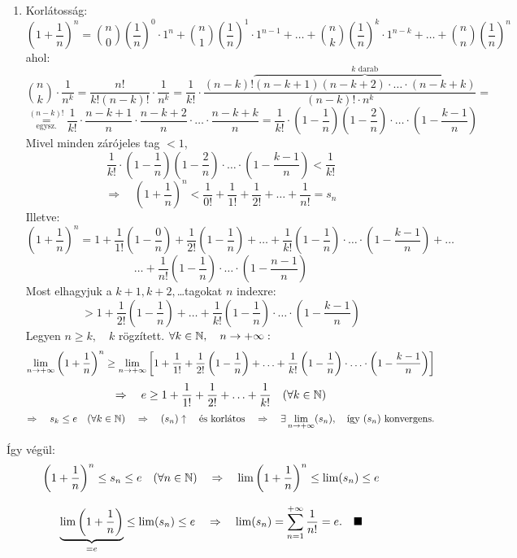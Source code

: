 \documentclass[a4paper,11.5pt]{article}
\begin{document}
\begin{enumerate}
\begin{enumerate}
			\item Korlátosság: 
			\[ \left(1+\frac{1}{n}\right)^n=\binom{n}{0}\left(\frac{1}{n}\right)^0\cdot1^n+\binom{n}{1}\left(\frac{1}{n}\right)^1\cdot1^{n-1}+\ldots+\binom{n}{k}\left(\frac{1}{n}\right)^k\cdot1^{n-k}+\ldots+\binom{n}{n}\left(\frac{1}{n}\right)^n \]
			ahol:
			\[ \binom{n}{k}\cdot\frac{1}{n^k}=\frac{n!}{k!(n-k)!}\cdot\frac{1}{n^k}=\frac{1}{k!}\cdot\frac{(n-k)!\overbrace{(n-k+1)(n-k+2)\cdot\ldots\cdot(n-k+k)}^{\text{$k$ darab}}}{(n-k)!\cdot n^k}= \]
			\[ \overset{(n-k)!}{\underset{\text{egysz.}}{=}}\frac{1}{k!}\cdot\frac{n-k+1}{n}\cdot\frac{n-k+2}{n}\cdot\ldots\cdot\frac{n-k+k}{n}=\frac{1}{k!}\cdot\left(1-\frac{1}{n}\right)\left(1-\frac{2}{n}\right)\cdot\ldots\cdot\left(1-\frac{k-1}{n}\right) \]
			Mivel minden zárójeles tag $<1$,
			\[ \frac{1}{k!}\cdot\left(1-\frac{1}{n}\right)\left(1-\frac{2}{n}\right)\cdot\ldots\cdot\left(1-\frac{k-1}{n}\right)<\frac{1}{k!} \] 
			\[ \Rightarrow\quad \left(1+\frac{1}{n}\right)^n<\frac{1}{0!}+\frac{1}{1!}+\frac{1}{2!}+\ldots+\frac{1}{n!}=s_n \]
			Illetve:
			\[ \left(1+\frac{1}{n}\right)^n=1+\frac{1}{1!}\left(1-\frac{0}{n}\right)+\frac{1}{2!}\left(1-\frac{1}{n}\right)+\ldots+\frac{1}{k!}\left(1-\frac{1}{n}\right)\cdot\ldots\cdot\left(1-\frac{k-1}{n}\right)+\ldots\]
			\[\ldots+\frac{1}{n!}\left(1-\frac{1}{n}\right)\cdot\ldots\cdot\left(1-\frac{n-1}{n}\right) \]
			Most elhagyjuk a $k+1, k+2,$\ldots tagokat $n$ indexre:
			\[ >1+\frac{1}{2!}\left(1-\frac{1}{n}\right)+\ldots+\frac{1}{k!}\left(1-\frac{1}{n}\right)\cdot\ldots\cdot\left(1-\frac{k-1}{n}\right) \]
			Legyen $n\geq k, \quad k$ rögzített. \quad $\forall k\in \mathbb{N}, \quad n\to+\infty:$
			\[\displaystyle\lim_{n\to +\infty}\left(1+\frac{1}{n}\right)^n\geq\displaystyle\lim_{n\to +\infty}\left[1+\frac{1}{1!}+\frac{1}{2!}\left(1-\frac{1}{n}\right)+\ldots+\frac{1}{k!}\left(1-\frac{1}{n}\right)\cdot\ldots\cdot\left(1-\frac{k-1}{n}\right)\right]\]
			\[\Rightarrow\quad e\geq\displaystyle 1+\frac{1}{1!}+\frac{1}{2!}+\ldots+\frac{1}{k!}\quad (\forall k\in\mathbb{N})\]
			\[\Rightarrow\quad s_k\leq e\quad (\forall k\in\mathbb{N})\quad \Rightarrow\quad (s_n)\uparrow \quad \text{és korlátos}\quad \Rightarrow\quad \exists \displaystyle\lim_{n\to +\infty}(s_n), \text{\quad így $(s_n) $ konvergens.}  \]
		\end{enumerate}
		Így végül:
		\[\left(1+\frac{1}{n}\right)^n\leq s_n\leq e\quad (\forall n\in\mathbb{N})\quad \Rightarrow\quad \lim\left(1+\frac{1}{n}\right)^n\leq\lim(s_n)\leq e  \]
		
		\[ \underbrace{\lim\left(1+\frac{1}{n}\right)}_{=e}\leq\lim(s_n)\leq e\quad \Rightarrow\quad \lim(s_n)=\displaystyle\sum_{n=1}^{+\infty}\frac{1}{n!}=e.\quad \blacksquare \]
	\end{enumerate}
	
\end{document}
